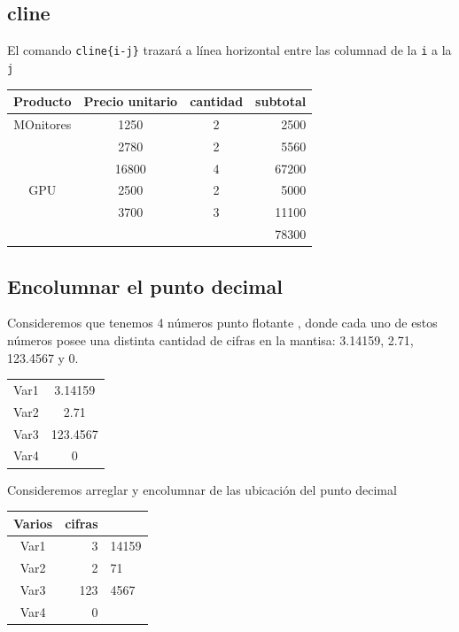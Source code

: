\documentclass[]{article}
\begin{document}
\begin{itemize}
\subsection {cline}
El comando \verb*|cline{i-j}| trazará a línea horizontal entre las columnad de la \verb*|i| a la  \verb*|j|
\begin{center}
	\begin{tabular}[]{cccr}
		\hline 
		Producto & Precio unitario &cantidad &subtotal \\
		\hline	
		MOnitores & 1250 & 2 & 2500 \\
		          & 2780 & 2 & 5560 \\
		          & 16800 & 4 & 67200 \\
		 \hline
		 GPU      & 2500 & 2 & 5000 \\
		          & 3700 & 3 & 11100 \\
		          \cline{4-4}   %
		          &      &   & 78300
		
	\end{tabular}

\end{center}

	\end{itemize}




\subsection {Encolumnar el punto decimal}
Consideremos que tenemos 4 números punto flotante , donde cada uno de estos números posee una distinta cantidad de cifras en la mantisa: 3.14159, 2.71, 123.4567 y 0.
\begin{center}
	\begin{tabular}[]{cc}
		\hline 
		Var1 & 3.14159 \\
		Var2 & 2.71 \\
		Var3 & 123.4567 \\
		Var4 & 0 \\
		\hline	
			
		\end{tabular}
	\end{center}


	
Consideremos arreglar y encolumnar de las ubicación del punto decimal
\begin{center}
	\begin{tabular}[]{cr@{.}l}
		Varios &  cifras & \\
		\hline 
		Var1 & 3&14159 \\
		Var2 & 2&71 \\
		Var3 & 123&4567 \\
		Var4 & 0 &\\
		\hline	
		
	\end{tabular}
\end{center}	
	
\end{document}
